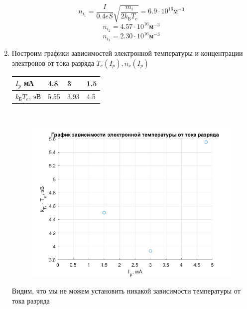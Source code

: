 \documentclass[a4paper,12pt]{article}
\begin{document}
\begin{enumerate}
\[n_{i_1}=\frac{I}{0.4eS}\sqrt{\frac{m_i}{2k_\text{Б}T_e}}=6.9\cdot 10^{16}\text{м}^{-3}\]
\[n_{i_2}=4.57\cdot 10^{16}\text{м}^{-3}\]
\[n_{i_3}=2.30\cdot 10^{16}\text{м}^{-3}\]
\item Построим графики зависимостей электронной температуры и концентрации электронов от тока разряда $T_e(I_p), n_e(I_p)$
\begin{table}[h!]
\centering
\begin{tabular}{|l|l|l|l|}
\hline
$I_p$ мА              & 4.8  & 3    & 1.5 \\ \hline
$k_{\text{Б}}T_e$, эВ & 5.55 & 3.93 & 4.5 \\ \hline
\end{tabular}
\end{table}\\
\begin{figure}[h!]
\centering
\includegraphics[scale=0.6]{graph_4.png}
\caption{}
\end{figure}
Видим, что мы не можем установить никакой зависимости температуры от тока разряда\\


\end{enumerate}
\end{document}

